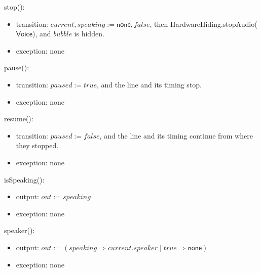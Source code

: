 \documentclass[10pt, titlepage]{article}
\newcommand{\T}[1]{\mathit{#1}}          %
\newcommand{\V}[1]{\mathsf{#1}}          %
\newcommand{\out}{\mathit{out}}
\newcommand{\true}{\mathit{true}}
\newcommand{\false}{\mathit{false}}
\begin{document}
\begin{samepage}
\noindent stop():
\begin{itemize}
\item transition: $\T{current}, \T{speaking} := \V{none}, \false$,
  then HardwareHiding.stopAudio($\V{Voice}$), and $\T{bubble}$ is hidden.
\item exception: none
\end{itemize}
\end{samepage}
\par\pagebreak[0]

\begin{samepage}
\noindent pause():
\begin{itemize}
\item transition: $\T{paused} := \true$, and the line and its timing stop.
\item exception: none
\end{itemize}
\end{samepage}
\par\pagebreak[0]

\begin{samepage}
\noindent resume():
\begin{itemize}
\item transition: $\T{paused} := \false$, and the line and its timing continue
  from where they stopped.
\item exception: none
\end{itemize}
\end{samepage}
\par\pagebreak[0]

\begin{samepage}
\noindent isSpeaking():
\begin{itemize}
\item output: $\out := \T{speaking}$
\item exception: none
\end{itemize}
\end{samepage}
\par\pagebreak[0]

\begin{samepage}
\noindent speaker():
\begin{itemize}
\item output: $\out := (\T{speaking} \Rightarrow \T{current}.\T{speaker} \mid
  \true \Rightarrow \V{none})$
\item exception: none
\end{itemize}
\end{samepage}
\par\pagebreak[0]
\end{document}
